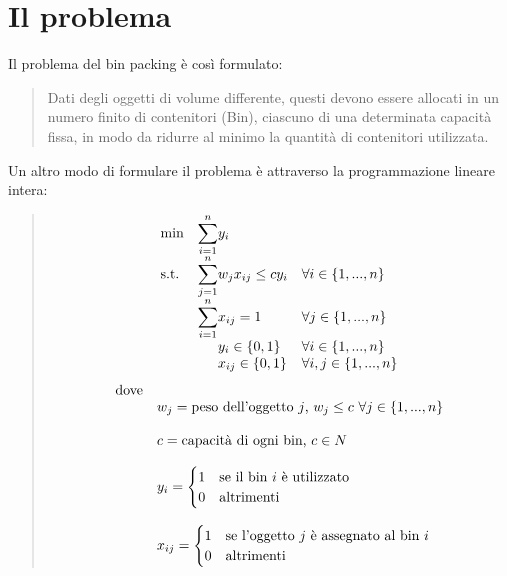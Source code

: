 \section{Il problema}
Il problema del bin packing è così formulato:
\begin{quote}
	Dati degli oggetti di volume differente, questi devono essere allocati in un numero finito di
	contenitori (Bin), ciascuno di una determinata capacità fissa, in modo da ridurre al minimo la
	quantità di contenitori utilizzata.\\
\end{quote}
\noindent
Un altro modo di formulare il problema è attraverso la programmazione lineare intera:
\begin{quote}	
	\begin{equation*}
		\begin{array}{ll@{}ll}
			\text{min}  & \displaystyle\sum\limits_{i=1}^{n} & y_i 					  & \\
			\text{s.t.} & \displaystyle\sum\limits_{j=1}^{n} & w_j x_{ij} \leq c y_i  & \forall i \in \{1, ..., n\}    \\
		                & \displaystyle\sum\limits_{i=1}^{n} & x_{ij} = 1 			  & \forall j \in \{1, ..., n\}    \\
		             	& 								     & y_{i} \in \{0,1\}	  & \forall i \in \{1, ..., n\}    \\
		                & 								     & x_{ij} \in \{0,1\}  	  & \forall i, j \in \{1, ..., n\} \\
		\end{array}
	\end{equation*}
	\begin{equation*}
		\begin{array}{ll@{}ll}
	    	\text{dove} &									& \\
	    				& w_j = \text{peso dell'oggetto } j	\text{, } w_j \leq c \text{ } \forall j \in \{1, ..., n\}  & \\ \\ 
		    			& c = \text{capacità di ogni bin, } c \in N & \\ \\
		    			& y_i = 
		    				\begin{cases}
    							1 & \text{se il bin } i \text{ è utilizzato} \\
    							0 & \text{altrimenti}
							\end{cases}					    & \\ \\
						& x_{ij} = 
							\begin{cases}
    							1 & \text{se l'oggetto } j \text{ è assegnato al bin } i \\
    							0 & \text{altrimenti}
							\end{cases}					    & \\
		\end{array}
	\end{equation*}
\end{quote}
